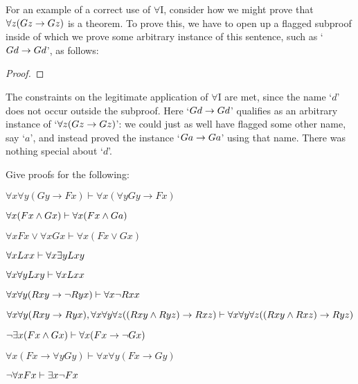 For an example of a correct use of $\forall$I, consider how we might prove that $\forall z(Gz \rightarrow Gz)$ is a theorem.  To prove this, we have to open up a flagged subproof inside of which we prove some arbitrary instance of this sentence, such as `$Gd \rightarrow Gd$', as follows:

\begin{proof}
	\open
	 \fl{}
	\open
		 
	\close
	\close
\end{proof}
The constraints on the legitimate application of $\forall$I are met, since the name `$d$' does not occur outside the subproof.  Here `$Gd \rightarrow Gd$' qualifies as an arbitrary instance of `$\forall z(Gz \rightarrow Gz)$': we could just as well have flagged some other name, say `$a$', and instead proved the instance `$Ga \rightarrow Ga$' using that name. There was nothing special about `$d$'.


\practiceproblems
\problempart Give proofs for the following:


\begin{earg}

\item $\forall x\forall y(Gy\rightarrow Fx) \vdash \forall x(\forall yGy\rightarrow Fx)$

\item $\forall x (Fx \wedge Gx) \vdash \forall x(Fx \wedge Ga)$

\item $\forall xFx\lor \forall xGx \vdash \forall x(Fx\lor Gx)$

\item $\forall xLxx \vdash \forall x \exists y Lxy$

\item $\forall x \forall y Lxy \vdash \forall xLxx$

\item $\forall x\forall y(Rxy \rightarrow \neg Ryx) \vdash \forall x \neg Rxx$

\item $\forall x \forall y(Rxy \rightarrow Ryx), \forall x \forall y \forall z((Rxy \wedge Ryz) \rightarrow Rxz) \vdash \forall x \forall y\forall z((Rxy \wedge Rxz) \rightarrow Ryz)$

\item $\neg \exists x(Fx \wedge Gx) \vdash \forall x(Fx \rightarrow \neg Gx)$

\item $\forall x(Fx\rightarrow \forall yGy) \vdash \forall x\forall y(Fx\rightarrow Gy)$

\item  $\neg \forall xFx \vdash \exists x\neg Fx$


\end{earg}





